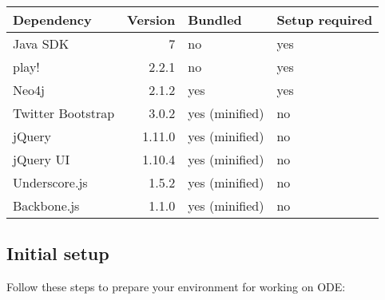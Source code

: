 \documentclass[11pt]{article}
\begin{document}
\begin{center}
\begin{tabular}{lrll}
\hline
\textbf{Dependency} & \textbf{Version} & \textbf{Bundled} & \textbf{Setup required}\\
\hline
Java SDK & 7 & no & yes\\
play! & 2.2.1 & no & yes\\
Neo4j & 2.1.2 & yes & yes\\
Twitter Bootstrap & 3.0.2 & yes (minified) & no\\
jQuery & 1.11.0 & yes (minified) & no\\
jQuery UI & 1.10.4 & yes (minified) & no\\
Underscore.js & 1.5.2 & yes (minified) & no\\
Backbone.js & 1.1.0 & yes (minified) & no\\
\hline
\end{tabular}
\end{center}

\subsection{Initial setup}
\label{sec-2-2}
Follow these steps to prepare your environment for working on ODE:
\end{document}

